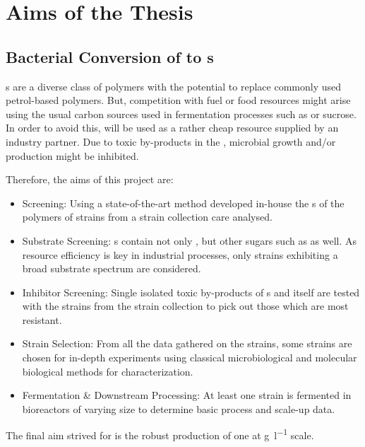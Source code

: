 \newpage
\section{Aims of the Thesis\label{sec-intro-aims}}
\subsection{Bacterial Conversion of \LCH{} to \EPS{}s}
\EPS{}s are a diverse class of polymers with the potential to replace commonly used petrol-based polymers. But, competition with fuel or food resources might arise using the usual carbon sources used in fermentation processes such as \glc{} or sucrose. In order to avoid this, \lch{} will be used as a rather cheap resource supplied by an industry partner. Due to toxic by-products in the \lch{}, microbial growth and/or production might be inhibited.

Therefore, the aims of this project are:
\begin{itemize}
	\item \EPS{} Screening: Using a state-of-the-art method developed in-house \cite{Ruehmann2015a} the \amc{}s of the polymers of strains from a strain collection care analysed.
	\item Substrate Screening: \LCh{}s contain not only \glc{}, but other sugars such as \xyl{} as well. As resource efficiency is key in industrial processes, only strains exhibiting a broad substrate spectrum are considered.
	\item Inhibitor Screening: Single isolated toxic by-products of \lch{}s and \lch{} itself are tested with the strains from the strain collection to pick out those which are most resistant.
	\item Strain Selection: From all the data gathered on the strains, some strains are chosen for in-depth experiments using classical microbiological and molecular biological methods for characterization.
	\item Fermentation \& Downstream Processing: At least one strain is fermented in bioreactors of varying size to determine basic process and scale-up data.
\end{itemize}

The final aim strived for is the robust production of one \eps{} at \si{\gram\per\litre} scale.

